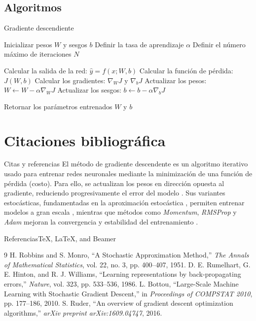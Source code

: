 \documentclass[11pt, aspectratio=169]{beamer}
\begin{document}
\subsection{Algoritmos}
\begin{frame}{Gradiente descendiente}
	\begin{algorithm}[H]
		\caption{Algoritmo de descenso más pronunciado para una red neuronal}
		\label{alg:steepest-descent}

		\begin{algorithmic}[1]
			\State Inicializar pesos $W$ y sesgos $b$
			\State Definir la tasa de aprendizaje $\alpha$
			\State Definir el número máximo de iteraciones $N$
			
			    \State Calcular la salida de la red: $\hat{y}=f(x;W,b)$
			    \State Calcular la función de pérdida: $J(W,b)$
			    \State Calcular los gradientes: $\nabla_W J$ y $\nabla_b J$
			    \State Actualizar los pesos: $W \leftarrow W - \alpha \nabla_W J$
			    \State Actualizar los sesgos: $b \leftarrow b - \alpha \nabla_b J$
			\EndFor
			
			\State Retornar los parámetros entrenados $W$ y $b$
		\end{algorithmic}
	\end{algorithm}
\end{frame}

\section{Citaciones bibliográfica}

\begin{frame}{Citas y referencias} 
El método de gradiente descendente es un algoritmo iterativo usado para entrenar redes neuronales mediante la minimización de una función de pérdida (costo). Para ello, se actualizan los pesos en dirección opuesta al gradiente, reduciendo progresivamente el error del modelo \cite{rumelhart1986}. Sus variantes estocásticas, fundamentadas en la aproximación estocástica \cite{robbins1951}, permiten entrenar modelos a gran escala \cite{bottou2010}, mientras que métodos como \textit{Momentum}, \textit{RMSProp} y \textit{Adam} mejoran la convergencia y estabilidad del entrenamiento \cite{ruder2016}.
\end{frame}

\begin{frame}{Referencias}{\TeX, \LaTeX, and Beamer}
	\begin{thebibliography}{9} 
		 H. Robbins and S. Monro, ``A Stochastic Approximation Method,'' \textit{The Annals of Mathematical Statistics}, vol. 22, no. 3, pp. 400--407, 1951.
		 D. E. Rumelhart, G. E. Hinton, and R. J. Williams, ``Learning representations by back-propagating errors,'' \textit{Nature}, vol. 323, pp. 533--536, 1986. 
		 L. Bottou, ``Large-Scale Machine Learning with Stochastic Gradient Descent,'' in \textit{Proceedings of COMPSTAT 2010}, pp. 177--186, 2010. 
		 S. Ruder, ``An overview of gradient descent optimization algorithms,'' \textit{arXiv preprint arXiv:1609.04747}, 2016. \end{thebibliography} 
\end{frame}

\agradecimiento
\end{document}
